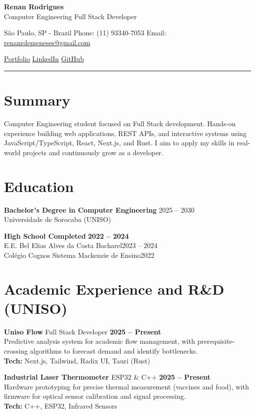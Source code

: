 \documentclass[10pt,a4paper]{article}
\begin{document}
{\Large\textbf{Renan Rodrigues}}\\
Computer Engineering \textbar{} Full Stack Developer

\vspace{2pt}
São Paulo, SP - Brazil \textbar{}
Phone: (11) 93340-7053 \textbar{}
Email: \href{mailto:renanrdemeneses@gmail.com}{renanrdemeneses@gmail.com}

\href{https://renanrod.vercel.app/}{Portfolio} \textbar{}
\href{https://linkedin.com/in/renanrod4}{LinkedIn} \textbar{}
\href{https://github.com/renanrod4}{GitHub}

\vspace{2pt}\hrule\vspace{2pt}

\section*{Summary}
Computer Engineering student focused on Full Stack development. Hands-on experience building web applications, REST APIs, and interactive systems using JavaScript/TypeScript, React, Next.js, and Rust. I aim to apply my skills in real-world projects and continuously grow as a developer.

\section*{Education}
\textbf{Bachelor's Degree in Computer Engineering} \hfill 2025 -- 2030\\
Universidade de Sorocaba (UNISO)

\textbf{High School Completed} \hfill \textbf{2022 -- 2024}\\
E.E. Bel Elias Alves da Costa Bacharel\hfill 2023 -- 2024\\
Colégio Cognos Sistema Mackenzie de Ensino\hfill{2022}\\

\section*{Academic Experience and R\&D (UNISO)}
\textbf{Uniso Flow} \textbar{} Full Stack Developer \hfill \textbf{2025 -- Present}\\
Predictive analysis system for academic flow management, with prerequisite-crossing algorithms to forecast demand and identify bottlenecks.\\
\textbf{Tech:} Next.js, Tailwind, Radix UI, Tauri (Rust)

\textbf{Industrial Laser Thermometer} \textbar{} ESP32 \& C++ \hfill \textbf{2025 -- Present}\\
Hardware prototyping for precise thermal measurement (vaccines and food), with firmware for optical sensor calibration and signal processing.\\
\textbf{Tech:} C++, ESP32, Infrared Sensors
\end{document}
